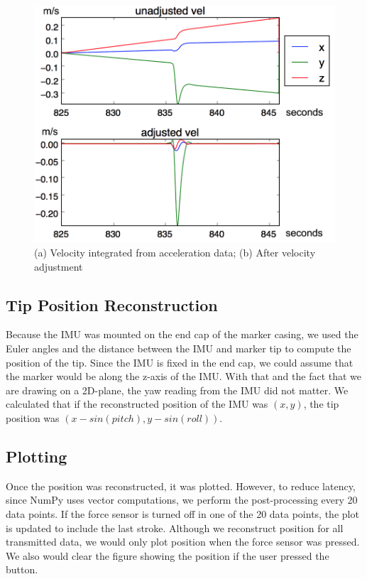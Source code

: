 \documentclass[12pt,journal]{IEEEtran}
\begin{document}
\begin{figure}[h]
  \centering
    \includegraphics[width=\linewidth]{figures/vel-adjust}
  \caption{(a) Velocity integrated from acceleration data; (b) After velocity adjustment}
  \label{fig:vel-adjust}
\end{figure}

\subsection{Tip Position Reconstruction}
Because the IMU was mounted on the end cap of the marker casing, we used the Euler angles and the distance between the IMU and marker tip to compute the position of the tip. Since the IMU is fixed in the end cap, we could assume that the marker would be along the z-axis of the IMU. With that and the fact that we are drawing on a 2D-plane, the yaw reading from the IMU did not matter. We calculated that if the reconstructed position of the IMU was $(x,y)$, the tip position was $(x-sin(pitch), y-sin(roll))$.


\subsection{Plotting}
	Once the position was reconstructed, it was plotted. However, to reduce latency, since NumPy uses vector computations, we perform the post-processing every 20 data points. If the force sensor is turned off in one of the 20 data points, the plot is updated to include the last stroke. Although we reconstruct position for all transmitted data, we would only plot position when the force sensor was pressed. We also would clear the figure showing the position if the user pressed the button. 
\end{document}
